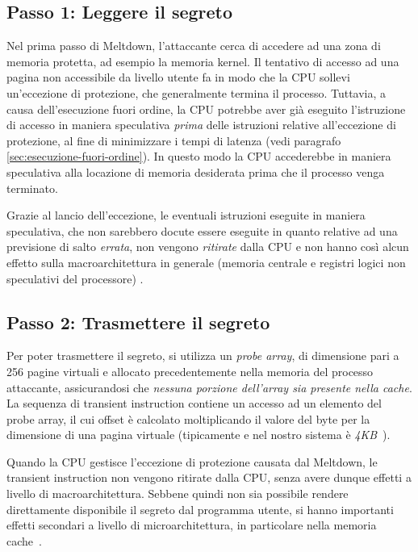 \subsection{Passo 1: Leggere il segreto}
Nel prima passo di Meltdown, l'attaccante cerca di accedere ad una zona di memoria protetta, ad esempio la memoria kernel.
Il tentativo di accesso ad una pagina non accessibile da livello utente fa in modo che la CPU sollevi un'eccezione di protezione, che generalmente termina il processo. 
Tuttavia, a causa dell'esecuzione fuori ordine, la CPU potrebbe aver già eseguito l'istruzione di accesso in maniera speculativa \emph{prima} delle istruzioni relative all'eccezione di protezione, al fine di minimizzare i tempi di latenza (vedi paragrafo \ref{sec:esecuzione-fuori-ordine}).
In questo modo la CPU accederebbe in maniera speculativa alla locazione di memoria desiderata prima che il processo venga terminato.

Grazie al lancio dell'eccezione, le eventuali istruzioni eseguite in maniera speculativa, che non sarebbero docute essere eseguite in quanto relative ad una previsione di salto \emph{errata}, non vengono \emph{ritirate} dalla CPU e non hanno così alcun effetto sulla macroarchitettura in generale (memoria centrale e registri logici non speculativi del processore) \cite{frosini:calcolatori2}.

\subsection{Passo 2: Trasmettere il segreto}
\label{sec:meltdown-passo-2}
Per poter trasmettere il segreto, si utilizza un \emph{probe array}, di dimensione pari a 256 pagine virtuali e allocato precedentemente nella memoria del processo attaccante, assicurandosi che \emph{nessuna porzione dell'array sia presente nella cache}. 
La sequenza di transient instruction contiene un accesso ad un elemento del probe array, il cui offset è calcolato moltiplicando il valore del byte per la dimensione di una pagina virtuale (tipicamente e nel nostro sistema  è \emph{4KB}~\cite{lettieri:paginazione}).

Quando la CPU gestisce l'eccezione di protezione causata dal Meltdown, le transient instruction non vengono ritirate dalla CPU, senza avere dunque effetti a livello di macroarchitettura. Sebbene quindi non sia possibile rendere direttamente disponibile il segreto dal programma utente, si hanno importanti effetti secondari a livello di microarchitettura, in particolare nella memoria cache~\cite{lipp:meltdown}.

